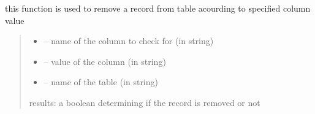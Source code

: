 \documentclass[letterpaper,10pt,english]{sphinxmanual}
\begin{document}
\begin{savenotes}
\begin{fulllineitems}
\begin{savenotes}
\begin{fulllineitems}
\begin{quote}
\begin{description}
\end{description}\end{quote}

\end{fulllineitems}\end{savenotes}


\begin{savenotes}\begin{fulllineitems}
\label{\detokenize{setting/database:oxin.database.dataBase.remove_record}}
\pysigstartsignatures
{}
\pysigstopsignatures
\sphinxAtStartPar
this function is used to remove a record from table acourding to specified column value
\begin{quote}\begin{description}
\begin{itemize}
\item {} 
\sphinxAtStartPar
{} – name of the column to check for (in string)

\item {} 
\sphinxAtStartPar
{} – value of the column (in string)

\item {} 
\sphinxAtStartPar
{} – name of the table (in string)

\end{itemize}

\sphinxAtStartPar
results: a boolean determining if the record is removed or not

\end{description}\end{quote}

\end{fulllineitems}\end{savenotes}


\begin{savenotes}\begin{fulllineitems}
\label{\detokenize{setting/database:oxin.database.dataBase.report_last}}
\pysigstartsignatures
{}
\pysigstopsignatures
\end{fulllineitems}\end{savenotes}


\end{fulllineitems}
\end{savenotes}
\end{document}
